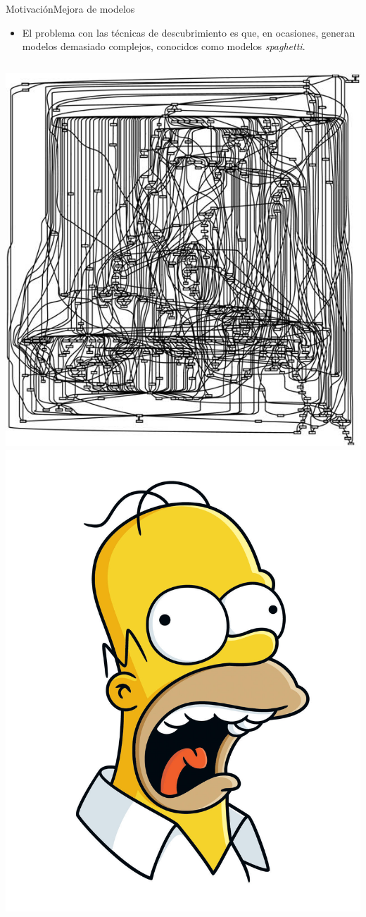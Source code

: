 \documentclass[spanish,pdf]{beamer}
\begin{document}
\begin{frame}{Motivación}{Mejora de modelos}
  \begin{itemize}
    \item<2-> El problema con las técnicas de descubrimiento es que, en ocasiones, generan modelos
              demasiado complejos, conocidos como modelos \textit{spaghetti}.
  \end{itemize}
  \pause[3]
  \begin{columns}
      \pause[4]
      \centering
      \includegraphics[width=0.8\linewidth]{img/spaghetti_model_2.jpg}
      \pause[5]
      \centering
      \includegraphics[width=0.5\linewidth]{img/homero_grita.jpg}


\end{columns}
\end{frame}
\end{document}
